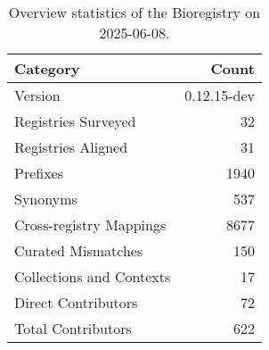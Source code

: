 \begin{table}
\caption{Overview statistics of the Bioregistry on 2025-06-08.}
\label{tab:bioregistry-summary}
\begin{tabular}{lr}
\toprule
Category & Count \\
\midrule
Version & 0.12.15-dev \\
Registries Surveyed & 32 \\
Registries Aligned & 31 \\
Prefixes & 1940 \\
Synonyms & 537 \\
Cross-registry Mappings & 8677 \\
Curated Mismatches & 150 \\
Collections and Contexts & 17 \\
Direct Contributors & 72 \\
Total Contributors & 622 \\
\bottomrule
\end{tabular}
\end{table}
